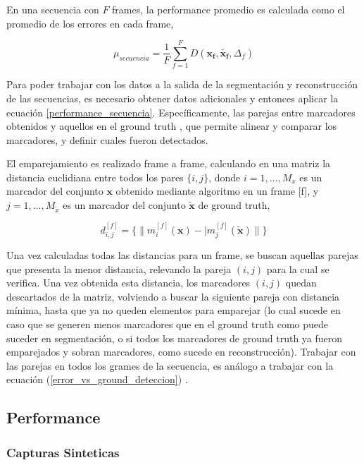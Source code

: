 En una secuencia con $F$ frames, la performance promedio es calculada como el promedio de los errores en cada frame,

\begin{equation}
\mu_{secuencia} = \frac{1}{F}\sum_{f=1}^{F} D(\boldsymbol{x_{f}},\boldsymbol{\tilde{x_{f}}},\Delta_{f})
\label{performance_secuencia}
\end{equation}

Para poder trabajar con los datos a la salida de la segmentación y reconstrucción de las secuencias, es necesario obtener datos adicionales y entonces aplicar la ecuación \ref{performance_secuencia}. Específicamente, las parejas entre marcadores obtenidos y aquellos en el ground truth , que permite alinear y comparar los marcadores, y definir cuales fueron detectados.

El emparejamiento es realizado frame a frame, calculando en una matriz la distancia euclidiana entre todos los pares $\{i,j\}$, donde $i=1,\ldots,M_{x}$ es un marcador del conjunto $\boldsymbol{x}$ obtenido mediante algoritmo en un frame [f], y $j=1,\ldots,M_{\tilde{x}}$ es un marcador del conjunto $\boldsymbol{\tilde{x}}$ de ground truth,

\begin{equation}
d_{i,j}^{[f]} = \{\|m_{i}^{[f]}(\boldsymbol{x})-|m_{j}^{[f]}(\boldsymbol{\tilde{x}})\|\}
\label{distancia_algoritmo_ground}
\end{equation}

Una vez calculadas todas las distancias para un frame, se buscan aquellas parejas que presenta la menor distancia, relevando la pareja $(i,j)$  para la cual se verifica. Una vez obtenida esta distancia, los marcadores $(i,j)$ quedan descartados de la matriz, volviendo a buscar la siguiente pareja con distancia mínima, hasta que ya no queden elementos para emparejar (lo cual sucede en caso que se generen menos marcadores que en el ground truth como puede suceder en segmentación, o si todos los marcadores de ground truth ya fueron emparejados y sobran marcadores, como sucede en reconstrucción). Trabajar con las parejas en todos los grames de la secuencia, es análogo a trabajar con la ecuación (\ref{error_vs_ground_deteccion}) .

\subsection{Performance}

\subsubsection{Capturas Sinteticas}

